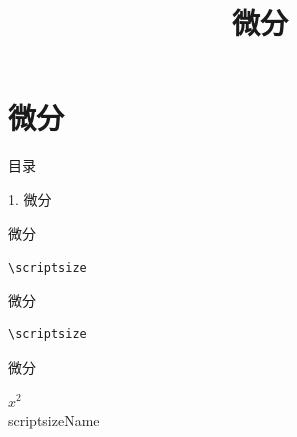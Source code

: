 \documentclass[aspectratio=169,10pt,fontset=fandol]{ctexbeamer}
\title{微分}
\begin{document}
\section{微分}
\begin{frame}[t,fragile]{目录}
\normalsize
{\color{blue}\normalsize 1. 微分\par}\vspace{0.22em}
\end{frame}
\begin{frame}[t,fragile]{微分}
\normalsize
{\normalsize
\verb|\scriptsize| %

}
\end{frame}
\begin{frame}[t,fragile]{微分}
\normalsize
{\normalsize
\begin{verbatim}\scriptsize\end{verbatim}
}
\end{frame}
\begin{frame}[t,fragile]{微分}
\normalsize
{\normalsize

$x^2$ \\scriptsizeName
}
\end{frame}
\end{document}
